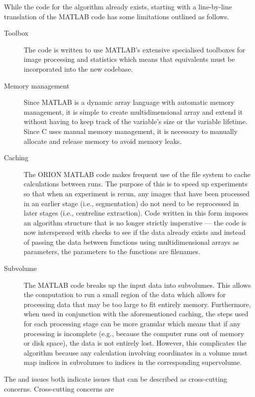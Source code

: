 While the code for the algorithm already exists, starting with a line-by-line
translation of the MATLAB code has some limitations outlined as follows.
\begin{description}
\item[Toolbox\label{desc:matlab:toolbox}] The code is written to use MATLAB's extensive 
	specialised toolboxes for image processing and
	statistics which means that equivalents must be
	incorporated into the new codebase.
\item[Memory management\label{desc:matlab:mem}] Since MATLAB is a dynamic array language with
	automatic memory management, it is simple to create
	multidimensional array and extend it without having to
	keep track of the variable's size or the variable
	lifetime. Since C uses manual memory management, it is
	necessary to manually allocate and release memory to avoid
	memory leaks.
\item[Caching\label{desc:matlab:cache}] The ORION MATLAB code makes frequent use of the file system
	to cache calculations between runs. The purpose of this is
	to speed up experiments so that when an experiment is
	rerun, any images that have been processed in an earlier
	stage (i.e., segmentation) do not need to be reprocessed
	in later stages (i.e., centreline extraction). Code
	written in this form imposes an algorithm structure
	that is no longer strictly imperative --- the code is now
	interspersed with checks to see if the data already exists
	and instead of passing the data between functions using
	multidimensional arrays as parameters, the parameters to
	the functions are filenames.
\item[Subvolume\label{desc:matlab:subvol}] The MATLAB code breaks up the input data into
	subvolumes. This allows the computation to run a small
	region of the data which allows for processing data that
	may be too large to fit entirely memory. Furthermore, when
	used in conjunction with the aforementioned caching, the
	steps used for each processing stage can be more granular
	which means that if any processing is incomplete (e.g.,
	because the computer runs out of memory or disk space),
	the data is not entirely lost. However, this complicates
	the algorithm because any calculation involving
	coordinates in a volume must map indices in subvolumes to
	indices in the corresponding supervolume.
\end{description}

The  and  issues both
indicate issues that can be described as cross-cutting concerns. Cross-cutting
concerns are  %

